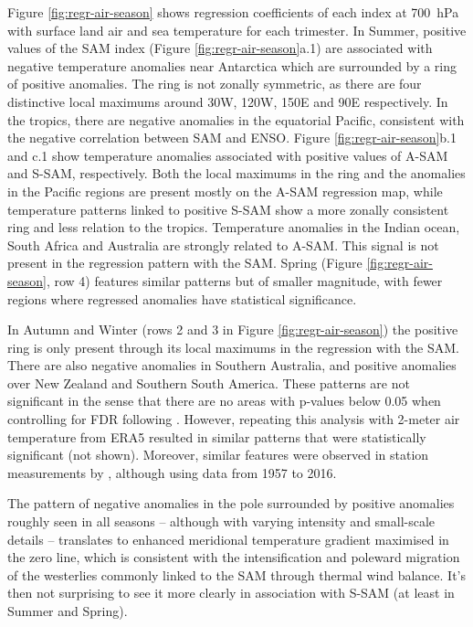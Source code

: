 \documentclass[smallextended]{svjour3}       %
\begin{document}
Figure \ref{fig:regr-air-season} shows regression coefficients of each index at 700~hPa with surface land air and sea temperature for each trimester. In Summer, positive values of the SAM index (Figure \ref{fig:regr-air-season}a.1) are associated with negative temperature anomalies near Antarctica which are surrounded by a ring of positive anomalies. The ring is not zonally symmetric, as there are four distinctive local maximums around 30\degree W, 120\degree W, 150\degree E and 90\degree E respectively. In the tropics, there are negative anomalies in the equatorial Pacific, consistent with the negative correlation between SAM and ENSO. Figure \ref{fig:regr-air-season}b.1 and c.1 show temperature anomalies associated with positive values of A\nobreakdash-SAM and S\nobreakdash-SAM, respectively. Both the local maximums in the ring and the anomalies in the Pacific regions are present mostly on the A\nobreakdash-SAM regression map, while temperature patterns linked to positive S\nobreakdash-SAM show a more zonally consistent ring and less relation to the tropics. Temperature anomalies in the Indian ocean, South Africa and Australia are strongly related to A\nobreakdash-SAM. This signal is not present in the regression pattern with the SAM. Spring (Figure \ref{fig:regr-air-season}, row 4) features similar patterns but of smaller magnitude, with fewer regions where regressed anomalies have statistical significance.

In Autumn and Winter (rows 2 and 3 in Figure \ref{fig:regr-air-season}) the positive ring is only present through its local maximums in the regression with the SAM. There are also negative anomalies in Southern Australia, and positive anomalies over New Zealand and Southern South America. These patterns are not significant in the sense that there are no areas with p-values below 0.05 when controlling for FDR following \citet{wilks2016}. However, repeating this analysis with 2-meter air temperature from ERA5 resulted in similar patterns that were statistically significant (not shown). Moreover, similar features were observed in station measurements by \citet{jones2019}, although using data from 1957 to 2016.

The pattern of negative anomalies in the pole surrounded by positive anomalies roughly seen in all seasons -- although with varying intensity and small-scale details -- translates to enhanced meridional temperature gradient maximised in the zero line, which is consistent with the intensification and poleward migration of the westerlies commonly linked to the SAM through thermal wind balance. It's then not surprising to see it more clearly in association with S\nobreakdash-SAM (at least in Summer and Spring).
\end{document}
